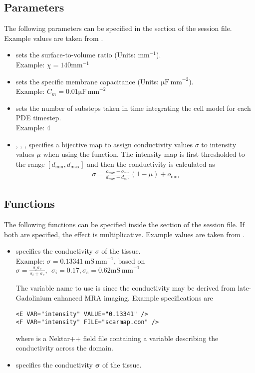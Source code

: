 \subsection{Parameters}
The following parameters can be specified in the  section of
the session file. Example values are taken from \cite{NiKeBeBeBe11}.
\begin{itemize}
    \item {} sets the surface-to-volume ratio (Units:
 $\mathrm{mm}^{-1}$).\\ Example: $\chi= 140 \mathrm{mm}^{-1}$
    \item {} sets the specific membrane capacitance (Units:
 $\mathrm{\mu F\,mm}^{-2}$).\\ Example: $C_m= 0.01 \mathrm{\mu F\,mm}^{-2}$
    \item {} sets the number of substeps taken in time
    integrating the cell model for each PDE timestep.\\ Example: 4
    \item {}, , , 
    specifies a bijective map to assign conductivity values $\sigma$ to
    intensity values $\mu$ when using the 
    function. The intensity map is first thresholded to the range
    $[d_{\min},d_{\max}]$ and then the conductivity is calculated as
\begin{align*}
\sigma = \frac{o_{\max} - o_{\min}}{d_{\max}-d_{\min}} (1 - \mu) + o_{\min}
\end{align*}
\end{itemize}

\subsection{Functions}
The following functions can be specified inside the  section
of the session file. If both are specified, the effect is multiplicative.
Example values are taken from \cite{NiKeBeBeBe11}.
\begin{itemize}
	\item {} specifies the conductivity
	$\sigma$ of the tissue. \\ 
	Example: $\sigma =0.13341 \ \mathrm{mS\,mm}^{-1}$, based on $\sigma
	= \frac{\sigma_i \sigma_e} {\sigma_i + \sigma_e}, \ \  \sigma_i=0.17, \sigma_e=0.62  \mathrm{mS\,mm}^{-1} $
  
  The variable name to use is  since the conductivity may be
  derived from late-Gadolinium enhanced MRA imaging. Example specifications are 
\begin{lstlisting}[style=XmlStyle]
<E VAR="intensity" VALUE="0.13341" />
<F VAR="intensity" FILE="scarmap.con" />
\end{lstlisting}
  where  is a Nektar++ field file containing a variable
   describing the conductivity across the domain.

    \item {} specifies the conductivity
$\mathbf{\sigma}$ of the tissue.
\end{itemize}


